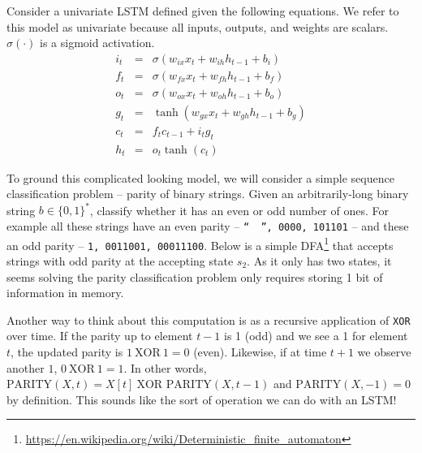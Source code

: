 \documentclass[a4paper,10pt]{article}
\begin{document}
Consider a univariate LSTM defined given the following equations. We refer to this model as univariate because all inputs, outputs, and weights are scalars. $\sigma(\cdot)$ is a sigmoid activation. 
\begin{eqnarray}
    i_t &=& \sigma(w_{ix}x_t + w_{ih}h_{t-1}+b_i)\\
    f_t &=& \sigma(w_{fx}x_t + w_{fh}h_{t-1}+b_f)\\
    o_t &=& \sigma(w_{ox}x_t + w_{oh}h_{t-1}+b_o)\\
    g_t &=& \tanh(w_{gx}x_t + w_{gh}h_{t-1}+b_g)\\
    c_t &=& f_tc_{t-1}+i_tg_t\\
    h_t &=& o_t \tanh(c_t)
\end{eqnarray}

\noindent To ground this complicated looking model, we will consider a simple sequence classification problem -- parity of binary strings. Given an arbitrarily-long binary string $b \in \{0,1\}^*$, classify whether it has an even or odd number of ones. For example all these strings have an even parity -- \texttt{``~~'', 0000, 101101} -- and these an odd parity -- \texttt{1, 0011001, 00011100}. Below is a simple DFA\footnote{\url{https://en.wikipedia.org/wiki/Deterministic_finite_automaton}} that accepts strings with odd parity at the accepting state $s_2$. As it only has two states, it seems solving the parity classification problem only requires storing 1 bit of information in memory.
\begin{center}
\end{center}

\noindent Another way to think about this computation is as a recursive application of \texttt{XOR} over time. If the parity up to element $t-1$ is 1 (odd) and we see a 1 for element $t$, the updated parity is $1~\mbox{XOR}~1 = 0$ (even). Likewise, if at time $t+1$ we observe another $1$, $0~\mbox{XOR}~1 = 1$. In other words, $\mbox{PARITY}(X,t) = X[t]~\mbox{XOR PARITY}(X, t-1)$ and $\mbox{PARITY}(X, -1)=0$ by definition. This sounds like the sort of operation we can do with an LSTM!
\end{document}
